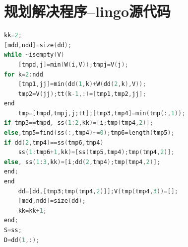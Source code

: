 \documentclass{cumcmthesis}
\begin{document}
 \section{规划解决程序--lingo源代码}
\begin{lstlisting}[language=c]
kk=2;
[mdd,ndd]=size(dd);
while ~isempty(V)
    [tmpd,j]=min(W(i,V));tmpj=V(j);
for k=2:ndd
    [tmp1,jj]=min(dd(1,k)+W(dd(2,k),V));
    tmp2=V(jj);tt(k-1,:)=[tmp1,tmp2,jj];
end
    tmp=[tmpd,tmpj,j;tt];[tmp3,tmp4]=min(tmp(:,1));
if tmp3==tmpd, ss(1:2,kk)=[i;tmp(tmp4,2)];
else,tmp5=find(ss(:,tmp4)~=0);tmp6=length(tmp5);
if dd(2,tmp4)==ss(tmp6,tmp4)
    ss(1:tmp6+1,kk)=[ss(tmp5,tmp4);tmp(tmp4,2)];
else, ss(1:3,kk)=[i;dd(2,tmp4);tmp(tmp4,2)];
end;
end
    dd=[dd,[tmp3;tmp(tmp4,2)]];V(tmp(tmp4,3))=[];
    [mdd,ndd]=size(dd);
    kk=kk+1;
end;
S=ss;
D=dd(1,:);
 \end{lstlisting}
\end{document}
